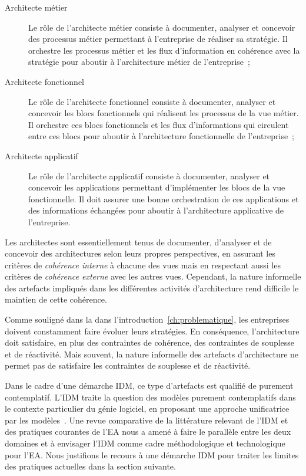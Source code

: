 \begin{description}
    \item[Architecte métier]
    Le rôle de l'architecte métier consiste à documenter, analyser et concevoir
    des processus métier permettant à l'entreprise de réaliser sa stratégie.
    Il orchestre les processus métier et les flux d'information en cohérence
    avec la stratégie pour aboutir à l'architecture métier de l'entreprise~;

    \item[Architecte fonctionnel]
    Le rôle de l'architecte fonctionnel consiste à documenter, analyser et
    concevoir les blocs fonctionnels qui réalisent les processus de
    la vue métier. Il orchestre ces blocs fonctionnels et les flux d'informations
    qui circulent entre ces blocs pour aboutir à l'architecture fonctionnelle
    de l'entreprise~;

    \item[Architecte applicatif]
    Le rôle de l'architecte applicatif consiste à documenter, analyser
    et concevoir les applications permettant d'implémenter les blocs
    de la vue fonctionnelle. Il doit assurer une bonne orchestration de ces
    applications et des informations échangées pour aboutir à l'architecture
    applicative de l'entreprise.
\end{description}

Les architectes sont essentiellement tenus de documenter, d'analyser et de
concevoir des architectures selon leurs propres perspectives, en assurant les
critères de \emph{cohérence interne} à chacune des vues mais en respectant
aussi les critères de \emph{cohérence externe} avec les autres vues. Cependant,
la nature informelle des artefacts impliqués dans les différentes activités
d’architecture rend difficile le maintien de cette cohérence.

Comme souligné dans la dans l'introduction~\ref{ch:problematique}, les
entreprises doivent constamment faire évoluer leurs stratégies. En conséquence,
l'architecture doit satisfaire, en plus des contraintes de cohérence, des
contraintes de souplesse et de réactivité. Mais souvent, la nature informelle
des artefacts d’architecture ne permet pas de satisfaire les contraintes de
souplesse et de réactivité.

Dans le cadre d'une démarche IDM, ce type d'artefacts est qualifié de purement
contemplatif. L'IDM traite la question des modèles purement contemplatifs dans
le contexte particulier du génie logiciel, en proposant une approche
unificatrice par les modèles~\cite{jezequel2006genie}. Une revue comparative
de la littérature relevant de l'IDM et des pratiques courantes de l'EA nous a
amené à faire le parallèle entre les deux domaines et
à envisager l'IDM comme cadre méthodologique et technologique pour l'EA.
Nous justifions le recours à une démarche IDM  pour traiter les
limites  des pratiques actuelles dans la section suivante.

